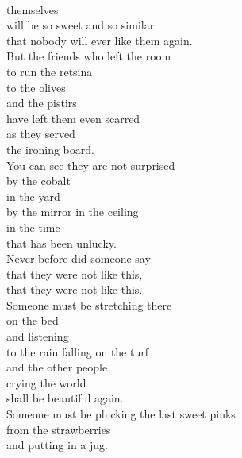 \documentclass[smalldemyvopaper,11pt,twoside,onecolumn,openright,extrafontsizes]{memoir}
\begin{document}
\\themselves
\\will be so sweet and so similar
\\that nobody will ever like them again.
\\But the friends who left the room
\\to run the retsina
\\to the olives
\\and the pistirs
\\have left them even scarred
\\as they served
\\the ironing board.
\\You can see they are not surprised
\\by the cobalt
\\in the yard
\\by the mirror in the ceiling
\\in the time
\\that has been unlucky.
\\Never before did someone say
\\that they were not like this,
\\that they were not like this.
\\Someone must be stretching there
\\on the bed
\\and listening
\\to the rain falling on the turf
\\and the other people
\\crying the world
\\shall be beautiful again.
\\Someone must be plucking the last sweet pinks
\\from the strawberries
\\and putting in a jug.
\end{document}
